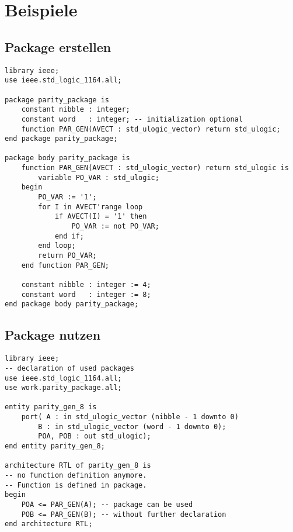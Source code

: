 \section{Beispiele}

\subsection{Package erstellen}

\begin{lstlisting}
library ieee;
use ieee.std_logic_1164.all;

package parity_package is
	constant nibble : integer; 
	constant word	: integer; -- initialization optional
	function PAR_GEN(AVECT : std_ulogic_vector) return std_ulogic;
end package parity_package;

package body parity_package is
	function PAR_GEN(AVECT : std_ulogic_vector) return std_ulogic is
		variable PO_VAR : std_ulogic;
	begin
		PO_VAR := '1';
		for I in AVECT'range loop
			if AVECT(I) = '1' then
				PO_VAR := not PO_VAR;
			end if;
		end loop;
		return PO_VAR;
	end function PAR_GEN;
	
	constant nibble : integer := 4;
	constant word	: integer := 8;
end package body parity_package;
\end{lstlisting}
\vspace{-20px}


\subsection{Package nutzen}
\begin{lstlisting}
library ieee;
-- declaration of used packages
use ieee.std_logic_1164.all;
use work.parity_package.all;
	
entity parity_gen_8 is
	port( A : in std_ulogic_vector (nibble - 1 downto 0)
		B : in std_ulogic_vector (word - 1 downto 0);
		POA, POB : out std_ulogic);
end entity parity_gen_8;

architecture RTL of parity_gen_8 is
-- no function definition anymore.
-- Function is defined in package.
begin
	POA <= PAR_GEN(A); -- package can be used
	POB <= PAR_GEN(B); -- without further declaration
end architecture RTL;
\end{lstlisting}


